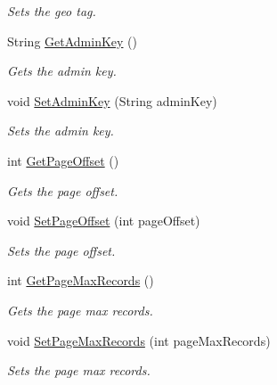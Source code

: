 \begin{DoxyCompactItemize}
\begin{DoxyCompactList}\small\item\em Sets the geo tag. \end{DoxyCompactList}\item 
String \hyperlink{classcom_1_1shephertz_1_1app42_1_1paas_1_1sdk_1_1csharp_1_1_app42_service_a939753b524246cdce075d72d57571a67}{Get\+Admin\+Key} ()
\begin{DoxyCompactList}\small\item\em Gets the admin key. \end{DoxyCompactList}\item 
void \hyperlink{classcom_1_1shephertz_1_1app42_1_1paas_1_1sdk_1_1csharp_1_1_app42_service_a62c25b7912cda94239c537b13e3c545f}{Set\+Admin\+Key} (String admin\+Key)
\begin{DoxyCompactList}\small\item\em Sets the admin key. \end{DoxyCompactList}\item 
int \hyperlink{classcom_1_1shephertz_1_1app42_1_1paas_1_1sdk_1_1csharp_1_1_app42_service_af611cb939372b24f61c9ebaa9787ae34}{Get\+Page\+Offset} ()
\begin{DoxyCompactList}\small\item\em Gets the page offset. \end{DoxyCompactList}\item 
void \hyperlink{classcom_1_1shephertz_1_1app42_1_1paas_1_1sdk_1_1csharp_1_1_app42_service_acf03b7b2946b4b4d5ad3c4ebe37dd4e7}{Set\+Page\+Offset} (int page\+Offset)
\begin{DoxyCompactList}\small\item\em Sets the page offset. \end{DoxyCompactList}\item 
int \hyperlink{classcom_1_1shephertz_1_1app42_1_1paas_1_1sdk_1_1csharp_1_1_app42_service_afd9ad42e5fb84a4c89ac63b1357ca98d}{Get\+Page\+Max\+Records} ()
\begin{DoxyCompactList}\small\item\em Gets the page max records. \end{DoxyCompactList}\item 
void \hyperlink{classcom_1_1shephertz_1_1app42_1_1paas_1_1sdk_1_1csharp_1_1_app42_service_a34de0f0fb119a76140d342a4198ace22}{Set\+Page\+Max\+Records} (int page\+Max\+Records)
\begin{DoxyCompactList}\small\item\em Sets the page max records. \end{DoxyCompactList}\item 

\end{DoxyCompactItemize}
